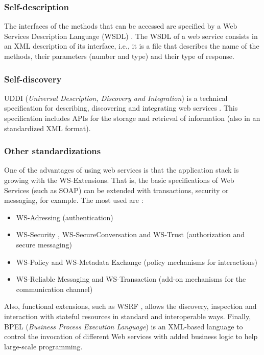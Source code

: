 \subsubsection{Self-description} The interfaces of the methods that can be accessed are specified by a Web Services Description Language (WSDL) \cite{WSDL}. The WSDL of a web service consists in an XML description of its interface, i.e., it is a file that describes the name of the methods, their parameters (number and type) and their type of response.

\subsubsection{Self-discovery} UDDI ({\em Universal Description, Discovery and Integration}) \cite{UDDI} is a technical specification for describing, discovering and integrating web services \cite{Cerami2002Webservices}. This specification includes APIs for the storage and retrieval of information (also in an standardized XML format).


\subsubsection{Other standardizations} One of the advantages of using
web services %
 is that the application stack is growing with the WS-Extensions. That is, the basic specifications of Web Services (such as SOAP) can be extended with transactions, security or messaging, for example. The most used are \cite{Papazoglou2007SOA}:
\begin{itemize}
  \item WS-Adressing  (authentication)
  \item WS-Security , WS-SecureConversation  and WS-Trust  (authorization and secure messaging)
  \item WS-Policy and WS-Metadata Exchange (policy mechanisms for interactions)
  \item WS-Reliable Messaging  and WS-Transaction (add-on mechanisms for the communication channel)
\end{itemize}
Also, functional extensions, such as WSRF \cite{WSRF}, %
 allows the discovery, inspection and interaction with stateful resources in standard and interoperable ways. Finally, BPEL ({\em Business Process Execution Language})  \cite{BPEL} is an XML-based language to control the invocation of different Web services with added business logic to help large-scale programming.


